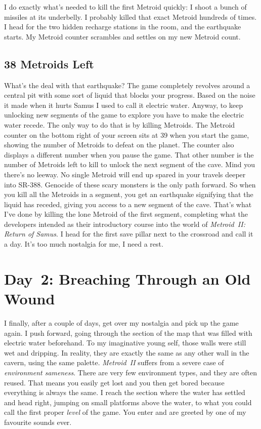 \documentclass{book}
\begin{document}
I do exactly what’s needed to kill the first Metroid quickly: I shoot a bunch of missiles at its underbelly. I probably killed that exact Metroid hundreds of times. I head for the two hidden recharge stations in the room, and the earthquake starts. My Metroid counter scrambles and settles on my new Metroid count.\par
\FloatBarrier\subsection*{38 Metroids Left}
What’s the deal with that earthquake? The game completely revolves around a central pit with some sort of liquid that blocks your progress. Based on the noise it made when it hurts Samus I used to call it electric water. Anyway, to keep unlocking new segments of the game to explore you have to make the electric water recede. The only way to do that is by killing Metroids. The Metroid counter on the bottom right of your screen sits at 39 when you start the game, showing the number of Metroids to defeat on the planet. The counter also displays a different number when you pause the game. That other number is the number of Metroids left to kill to unlock the next segment of the cave. Mind you there’s no leeway. No single Metroid will end up spared in your travels deeper into SR-388. Genocide of these scary monsters is the only path forward. So when you kill all the Metroids in a segment, you get an earthquake signifying that the liquid has receded, giving you access to a new segment of the cave. That’s what I’ve done by killing the lone Metroid of the first segment, completing what the developers intended as their introductory course into the world of \emph{Metroid~II: Return of Samus}. I head for the first save pillar next to the crossroad and call it a day. It’s too much nostalgia for me, I need a rest.\par
\FloatBarrier\section*{Day~2: Breaching Through an Old Wound}
I finally, after a couple of days, get over my nostalgia and pick up the game again. I push forward, going through the section of the map that was filled with electric water beforehand. To my imaginative young self, those walls were still wet and dripping. In reality, they are exactly the same as any other wall in the cavern, using the same palette. \emph{Metroid~II} suffers from a severe case of \emph{environment sameness}. There are very few environment types, and they are often reused. That means you easily get lost and you then get bored because everything is always the same. I reach the section where the water has settled and head right, jumping on small platforms above the water, to what you could call the first proper \emph{level} of the game. You enter and are greeted by one of my favourite sounds ever.\par
\end{document}
